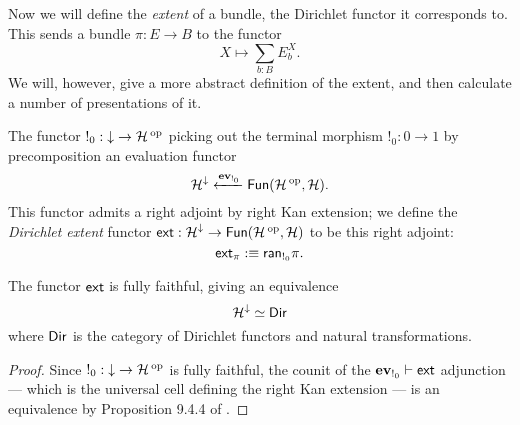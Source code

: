 Now we will define the \emph{extent} of a bundle, the Dirichlet functor it
corresponds to. This sends a bundle
$\pi : E \to B$ to the functor
$$X \mapsto \sum_{b : B} E_b^X.$$
We will, however, give a more abstract definition of the extent, and then
calculate a number of presentations of it.

\begin{defn}
  The functor $!_0 : \down \to \Ha\op$ picking out the terminal morphism
  $!_0 : 0 \to 1$ by precomposition an evaluation functor
  $$\Ha^{\down} \xleftarrow{\ev_{!_0}} \Fun(\Ha\op, \Ha).$$
  This functor admits a right adjoint by right Kan extension; we define the
  \emph{Dirichlet extent} functor $\ext : \Ha^{\down} \to \Fun(\Ha\op,
  \Ha)$ to be this right adjoint:
  $$\ext_{\pi} :\equiv \term{ran}_{!_0} \pi.$$
\end{defn}

\begin{prop}
  The functor $\ext$ is fully faithful, giving an equivalence
  $$\Ha^{\down} \simeq \Dir$$
  where $\Dir$ is the category of Dirichlet functors and natural transformations.
\end{prop}
\begin{proof}
Since $!_0 : \down \to \Ha\op$ is fully faithful, the counit of the
$\ev_{!_0} \vdash \ext$ adjunction --- which is the universal cell defining the
right Kan extension --- is an equivalence by Proposition 9.4.4 of \cite{RV:Elements}. 
\end{proof}

